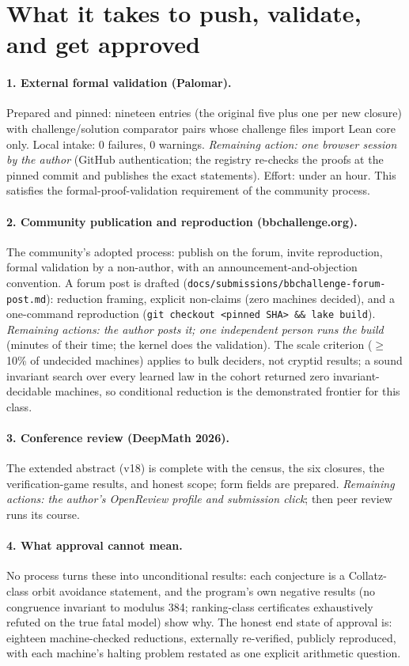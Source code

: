 \documentclass[11pt]{article}
\begin{document}
\section*{What it takes to push, validate, and get approved}

\paragraph{1. External formal validation (Palomar).} Prepared and
pinned: nineteen entries (the original five plus one per new
closure) with challenge/solution comparator pairs whose challenge
files import Lean core only. Local intake: 0 failures, 0 warnings.
\emph{Remaining action: one browser session by the author}
(GitHub authentication; the registry re-checks the proofs at the
pinned commit and publishes the exact statements). Effort: under an
hour. This satisfies the formal-proof-validation requirement of the
community process.

\paragraph{2. Community publication and reproduction
(bbchallenge.org).} The community's adopted process: publish on the
forum, invite reproduction, formal validation by a non-author, with
an announcement-and-objection convention. A forum post is drafted
(\texttt{docs/submissions/bbchallenge-forum-post.md}): reduction
framing, explicit non-claims (zero machines decided), and a
one-command reproduction
(\texttt{git checkout <pinned SHA> \&\& lake build}). \emph{Remaining
actions: the author posts it; one independent person runs the build}
(minutes of their time; the kernel does the validation). The
scale criterion ($\ge$10\% of undecided machines) applies to bulk
deciders, not cryptid results; a sound invariant search over every
learned law in the cohort returned zero invariant-decidable
machines, so conditional reduction is the demonstrated frontier for
this class.

\paragraph{3. Conference review (DeepMath 2026).} The extended
abstract (v18) is complete with the census, the six closures, the
verification-game results, and honest scope; form fields are
prepared. \emph{Remaining actions: the author's OpenReview profile
and submission click}; then peer review runs its course.

\paragraph{4. What approval cannot mean.} No process turns these
into unconditional results: each conjecture is a Collatz-class orbit
avoidance statement, and the program's own negative results
(no congruence invariant to modulus 384; ranking-class certificates
exhaustively refuted on the true fatal model) show why. The honest
end state of approval is: eighteen machine-checked reductions, externally
re-verified, publicly reproduced, with each machine's halting
problem restated as one explicit arithmetic question.
\end{document}
